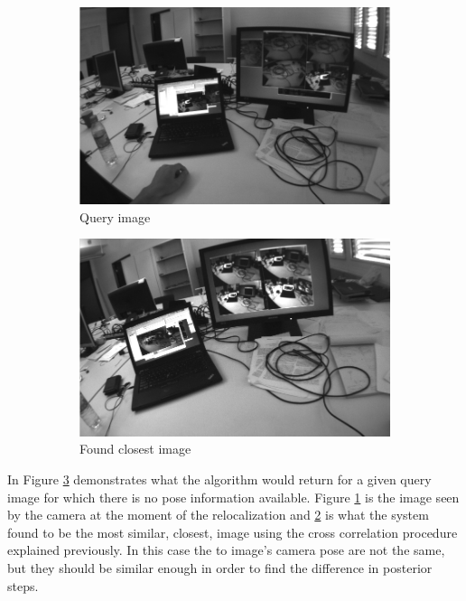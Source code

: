 \begin{figure}[!htpb]
  \centering
  \begin{subfigure}[b]{11cm}
    \includegraphics[width=\linewidth]{img/query_1.png}
    \caption{Query image}
    \label{fig:query_1}
  \end{subfigure}

  \begin{subfigure}[b]{11cm}
    \includegraphics[width=\linewidth]{img/best_match_1.png}
    \caption{Found closest image}
    \label{fig:best_match_1}
  \end{subfigure}
  \caption{}
  \label{fig:cc_example}
\end{figure}


In Figure \ref{fig:cc_example} demonstrates what the algorithm would return for a given query image for which there is no pose information available. Figure \ref{fig:query_1} is the image seen by the camera at the moment of the relocalization and \ref{fig:best_match_1} is what the system found to be the most similar, closest, image using the cross correlation procedure explained previously. In this case the to image's camera pose are not the same, but they should be similar enough in order to find the difference in posterior steps.\\

